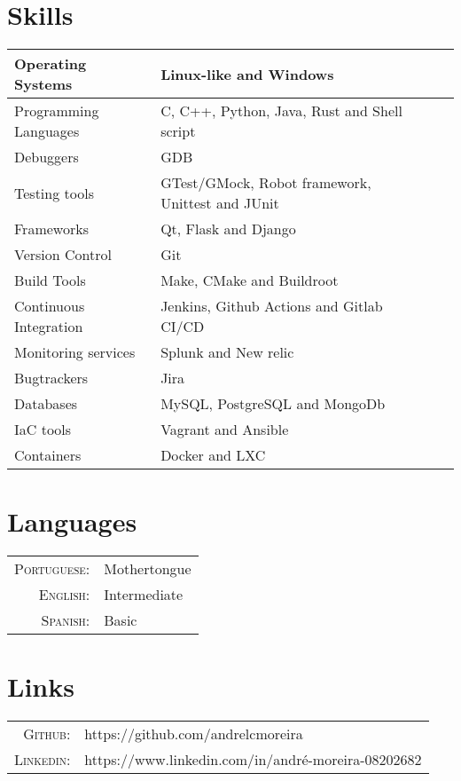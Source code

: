 \documentclass[a4paper,10pt]{article}
\begin{document}
\section{Skills}
\begin{center}
  \begin{tabular}{| l | l | l | l |}
    \hline
    Operating Systems & Linux-like and Windows\\ \hline
    Programming Languages & C, C++, Python, Java, Rust and Shell script\\ \hline
    Debuggers & GDB \\ \hline
    Testing tools & GTest/GMock, Robot framework, Unittest and JUnit\\ \hline
    Frameworks & Qt, Flask and Django\\ \hline
    Version Control & Git\\ \hline
    Build Tools & Make, CMake and Buildroot\\ \hline
    Continuous Integration & Jenkins, Github Actions and Gitlab CI/CD\\ \hline
    Monitoring services & Splunk and New relic\\ \hline
    Bugtrackers & Jira\\ \hline
    Databases & MySQL, PostgreSQL and MongoDb\\ \hline
    IaC tools & Vagrant and Ansible\\ \hline
    Containers & Docker and LXC\\ \hline
  \end{tabular}
\end{center}

\section{Languages}
\begin{tabular}{rl}
  \textsc{Portuguese:}& Mothertongue\\
  \textsc{English:}& Intermediate\\
  \textsc{Spanish:}& Basic\\
\end{tabular}

\section{Links}
\begin{tabular}{rl}
  \textsc{Github:}& https://github.com/andrelcmoreira\\
  \textsc{Linkedin:}&https://www.linkedin.com/in/andré-moreira-08202682 \\
\end{tabular}
\end{document}
